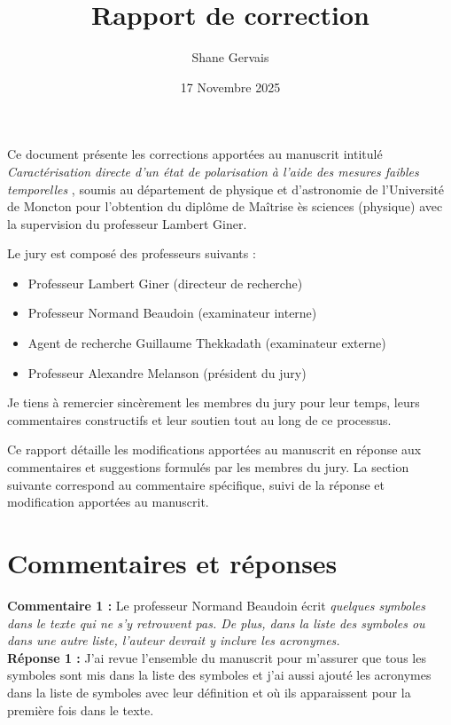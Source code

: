 \documentclass[superscriptaddress,12pt]{article}
\title{Rapport de correction}
\author{Shane Gervais}
\date{17 Novembre 2025}
\begin{document}
\maketitle

Ce document présente les corrections apportées au manuscrit intitulé
\guillemetleft \textit{Caractérisation directe d'un état de polarisation à l'aide des mesures faibles temporelles} \guillemetright,
soumis au département de physique et d'astronomie de l'Université de Moncton
pour l'obtention du diplôme de Maîtrise ès sciences (physique) avec la
supervision du professeur Lambert Giner. 

\vspace{1cm}

\noindent Le jury est composé des professeurs suivants :
\begin{itemize}
    \item Professeur Lambert Giner (directeur de recherche)
    \item Professeur Normand Beaudoin (examinateur interne)
    \item Agent de recherche Guillaume Thekkadath (examinateur externe)
    \item Professeur Alexandre Melanson (président du jury)
\end{itemize}
\vspace{1cm}

\noindent Je tiens à remercier sincèrement les membres du jury pour 
leur temps, leurs commentaires constructifs et leur soutien 
tout au long de ce processus.
\vspace{1cm}

\noindent Ce rapport détaille les modifications apportées au manuscrit en réponse aux
commentaires et suggestions formulés par les membres du jury. La section suivante
correspond au commentaire spécifique, suivi de la réponse et modification
apportées au manuscrit.

\section*{Commentaires et réponses}

\vspace{1cm}
\textbf{Commentaire 1 :} Le professeur Normand Beaudoin écrit \textit{quelques symboles dans le texte qui ne s’y
retrouvent pas. De plus, dans la liste des symboles ou dans une autre liste, l’auteur devrait y inclure
les acronymes.} \\ 

\textbf{Réponse 1 :} J'ai revue l'ensemble du manuscrit pour m'assurer que tous les symboles 
sont mis dans la liste des symboles et j'ai aussi ajouté les acronymes dans la liste de symboles avec
leur définition et où ils apparaissent pour la première fois dans le texte.
\end{document}
